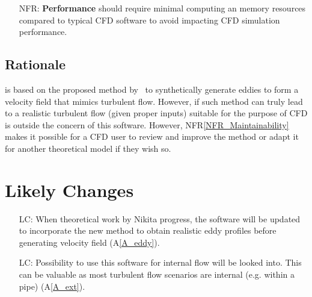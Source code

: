 \documentclass[12pt]{article}
\newcommand{\aref}[1]{A\ref{#1}}
\newcounter{nfrnum} %
\newcommand{\nfrref}[1]{NFR\ref{#1}}
\newcounter{lcnum} %
\begin{document}
\begin{itemize}

\item[NFR\refstepcounter{nfrnum}\thenfrnum \label{NFR_Performance}:]
  \textbf{Performance} \progname{} should require minimal computing an memory resources compared to typical CFD software to avoid impacting CFD simulation performance.

\end{itemize}

\subsection{Rationale}

\progname{} is based on the proposed method by~\citet{PolettoEtAl2013} to synthetically generate eddies to form a velocity field that mimics turbulent flow. However, if such method can truly lead to a realistic turbulent flow (given proper inputs) suitable for the purpose of CFD is outside the concern of this software. However, \nfrref{NFR_Maintainability} makes it possible for a CFD user to review and improve the method or adapt it for another theoretical model if they wish so. 


\section{Likely Changes}    

\noindent \begin{itemize}

\item[LC\refstepcounter{lcnum}\thelcnum\label{LC_realEddy}:] When theoretical work by Nikita progress, the software will be updated to incorporate the new method to obtain realistic eddy profiles before generating velocity field (\aref{A_eddy}).
\item[LC\refstepcounter{lcnum}\thelcnum\label{LC_internal}:] Possibility to use this software for internal flow will be looked into. This can be valuable as most turbulent flow scenarios are internal (e.g. within a pipe) (\aref{A_ext}).

\end{itemize}
\end{document}
